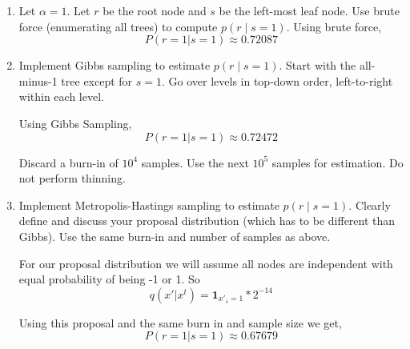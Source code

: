 \documentclass{article}
\begin{document}
\begin{enumerate}
\begin{enumerate}
  \item Let $\alpha=1$.  Let $r$ be the root node and $s$ be the left-most leaf node.
  Use brute force (enumerating all trees) to compute $p(r \mid s=1)$.
\color{blue}
Using brute force,
$$
P(r = 1 | s = 1) \approx 0.72087
$$
\color{black}  
  
  
  \item Implement Gibbs sampling to estimate $p(r \mid s=1)$.  Start with the all-minus-1 tree except for $s=1$.  Go over levels in top-down order, left-to-right within each level.
  
\color{blue}
Using Gibbs Sampling,
$$
P(r = 1 | s = 1) \approx 0.72472
$$
\color{black}  
  
  Discard a burn-in of $10^4$ samples.  Use the next $10^5$ samples for estimation.  Do not perform thinning.
  \item Implement Metropolis-Hastings sampling to estimate $p(r \mid s=1)$.  Clearly define and discuss your proposal distribution (which has to be different than Gibbs).  Use the same burn-in and number of samples as above.
  
\color{blue}
For our proposal distribution we will assume all nodes are independent with equal probability of being -1 or 1. So
$$
q(x' | x^t) = \mathbf{1}_{x'_s = 1} * 2^{-14}
$$

Using this proposal and the same burn in and sample size we get,
$$
P(r = 1 | s = 1) \approx 0.67679
$$

\color{black}  
 
  \end{enumerate}



\end{enumerate}
\end{document}
